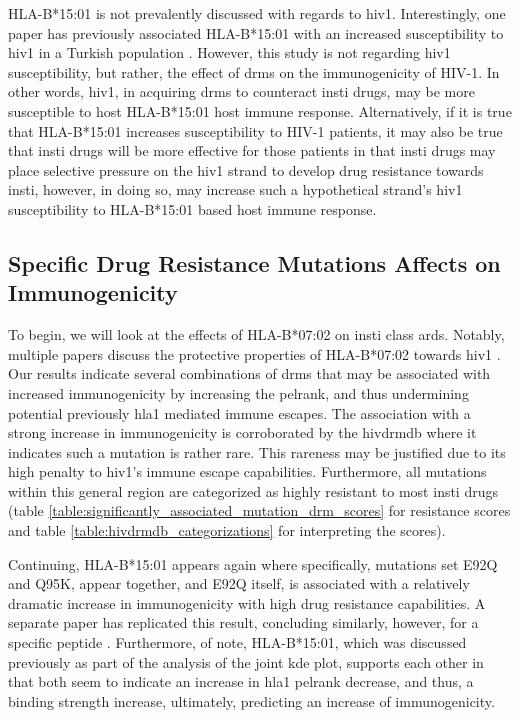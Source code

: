 HLA-B*15:01 is not prevalently discussed with regards to \ac{hiv1}. Interestingly, one paper has previously associated HLA-B*15:01 with an increased susceptibility to \ac{hiv1} in a Turkish population \cite{darbasRelationshipHLABAlleles2022}. However, this study is not regarding \ac{hiv1} susceptibility, but rather, the effect of \acp{drm} on the immunogenicity of HIV-1. In other words, \ac{hiv1}, in acquiring \acp{drm} to counteract \ac{insti} drugs, may be more susceptible to host HLA-B*15:01 host immune response. Alternatively, if it is true that HLA-B*15:01 increases susceptibility to HIV-1 patients, it may also be true that \ac{insti} drugs will be more effective for those patients in that \ac{insti} drugs may place selective pressure on the \ac{hiv1} strand to develop drug resistance towards \ac{insti}, however, in doing so, may increase such a hypothetical strand's \ac{hiv1} susceptibility to HLA-B*15:01 based host immune response.

\subsection{Specific Drug Resistance Mutations Affects on Immunogenicity}

To begin, we will look at the effects of HLA-B*07:02 on \ac{insti} class \acp{ard}. Notably, multiple papers discuss the protective properties of HLA-B*07:02 towards \ac{hiv1} \cite{darbasRelationshipHLABAlleles2022,sundaramurthiHLAB2705specific2013}. Our results indicate several combinations of \acp{drm} that may be associated with increased immunogenicity by increasing the \ac{pelrank}, and thus undermining potential previously \ac{hla1} mediated immune escapes. The association with a strong increase in immunogenicity is corroborated by the \ac{hivdrmdb} where it indicates such a mutation is rather rare. This rareness may be justified due to its high penalty to \ac{hiv1}'s immune escape capabilities. Furthermore, all mutations within this general region are categorized as highly resistant to most \ac{insti} drugs (table \ref{table:significantly_associated_mutation_drm_scores} for resistance scores and table \ref{table:hivdrmdb_categorizations} for interpreting the scores).

Continuing, HLA-B*15:01 appears again where specifically, mutations set E92Q and Q95K, appear together, and E92Q itself, is associated with a relatively dramatic increase in immunogenicity with high drug resistance capabilities. A separate paper has replicated this result, concluding similarly, however, for a specific peptide \cite{rahmanRaltegravirElvitegravirresistanceMutation2014}. Furthermore, of note, HLA-B*15:01, which was discussed previously as part of the analysis of the joint \ac{kde} plot, supports each other in that both seem to indicate an increase in \ac{hla1} \ac{pelrank} decrease, and thus, a binding strength increase, ultimately, predicting an increase of immunogenicity.

